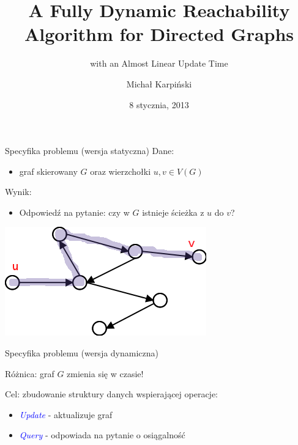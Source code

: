\documentclass{beamer}
\title{A Fully Dynamic Reachability Algorithm for Directed Graphs}
\subtitle{with an Almost Linear Update Time}
\author{Michał Karpiński}
\date{8 stycznia, 2013}
\newcommand{\emp}[1]{\textcolor{blue}{\textit{#1}}}
\begin{document}
\begin{frame}[plain]
  \titlepage
\end{frame}

\begin{frame}{Specyfika problemu (wersja statyczna)}
Dane: 

\begin{itemize}
\item graf skierowany $G$ oraz wierzchołki $u,v \in V(G)$
\end{itemize}

Wynik:

\begin{itemize}
\item Odpowiedź na pytanie: czy w $G$ istnieje ścieżka z $u$ do $v$?
\end{itemize}

\vspace{0.5cm}

\begin{center}
\includegraphics[scale=0.5]{img/Diagram1.png}
\end{center}

\end{frame}

\begin{frame}{Specyfika problemu (wersja dynamiczna)}

Różnica: graf $G$ zmienia się w czasie!


\vspace{0.5cm}

Cel: zbudowanie struktury danych wspierającej operacje:
\begin{itemize}
\item \emp{Update} - aktualizuje graf
\item \emp{Query} - odpowiada na pytanie o osiągalność
\end{itemize}
\end{frame}
\end{document}
